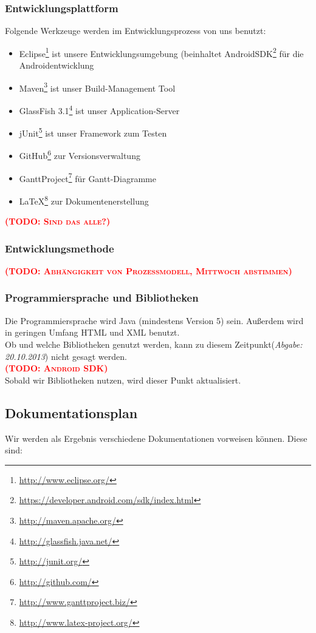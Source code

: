 \documentclass[fontsize=12pt,paper=a4,twoside]{scrartcl}
\newcommand{\todo}[1]{\textbf{\textsc{\textcolor{red}{(TODO: #1)}}}}
\begin{document}
\subsubsection{Entwicklungsplattform}
Folgende Werkzeuge werden im Entwicklungsprozess von uns benutzt:
\begin{itemize}

\item{Eclipse\footnote{\url{http://www.eclipse.org/}} ist unsere Entwicklungsumgebung (beinhaltet AndroidSDK\footnote{\url{https://developer.android.com/sdk/index.html}} für die Androidentwicklung}
\item{Maven\footnote{\url{http://maven.apache.org/}} ist unser Build-Management Tool}
\item{GlassFish 3.1\footnote{\url{http://glassfish.java.net/}} ist unser Application-Server}
\item{jUnit\footnote{\url{http://junit.org/}} ist unser Framework zum Testen}
\item{GitHub\footnote{\url{http://github.com/}} zur Versionsverwaltung}
\item{GanttProject\footnote{\url{http://www.ganttproject.biz/}}} für Gantt-Diagramme
\item{\LaTeX{}\footnote{\url{http://www.latex-project.org/}}} zur Dokumentenerstellung

\end{itemize}
\todo{Sind das alle?}

\subsubsection{Entwicklungsmethode}

\todo{Abhängigkeit von Prozessmodell, Mittwoch abstimmen}

\subsubsection{Programmiersprache und Bibliotheken}
Die Programmiersprache wird Java  (mindestens Version 5) sein. Außerdem wird in geringen Umfang HTML und XML benutzt.\\
Ob und welche Bibliotheken genutzt werden, kann zu diesem Zeitpunkt(\emph{Abgabe: 20.10.2013}) nicht gesagt werden.\\
\todo{Android SDK}
\\
Sobald wir Bibliotheken nutzen, wird dieser Punkt aktualisiert.
\subsection{Dokumentationsplan}
Wir werden als Ergebnis verschiedene Dokumentationen vorweisen können. Diese sind:
\end{document}
